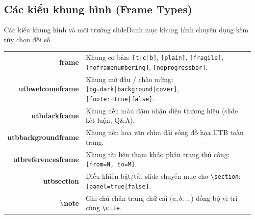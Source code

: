 \documentclass[aspectratio=169,10pt]{beamer}
\begin{document}
\subsection{Các kiểu khung hình (Frame Types)}
\begin{frame}{Các kiểu khung hình và môi trường slide}{Danh mục khung hình chuyên dụng kèm tùy chọn đối số}
  \scriptsize
  \centering
  \begin{tabularx}{\textwidth}{>{\ttfamily\bfseries\color{utbmain}}r >{\small}X}
    frame               & Khung cơ bản: \texttt{[t|c|b]}, \texttt{[plain]}, \texttt{[fragile]}, \texttt{[noframenumbering]}, \texttt{[noprogressbar]}. \\
    utbwelcomeframe    & Khung mở đầu / chào mừng: \texttt{[bg=dark|background|cover]}, \texttt{[footer=true|false]}. \\
    utbdarkframe       & Khung nền màu đậm nhận diện thương hiệu (slide kết luận, Q\&A). \\
    utbbackgroundframe & Khung nền hoa văn chìm dải sóng đồ họa UTB toàn trang. \\
    utbreferencesframe & Khung tài liệu tham khảo phân trang thủ công: \texttt{[from=N, to=M]}. \\
    utbsection         & Điều khiển bật/tắt slide chuyển mục cho \texttt{\textbackslash section}: \texttt{[panel=true|false]}. \\
    \textbackslash note & Ghi chú chân trang chữ cái ($a, b, \dots$) đồng bộ vị trí cùng \texttt{\textbackslash cite}. \\
  \end{tabularx}
\end{frame}
\end{document}
